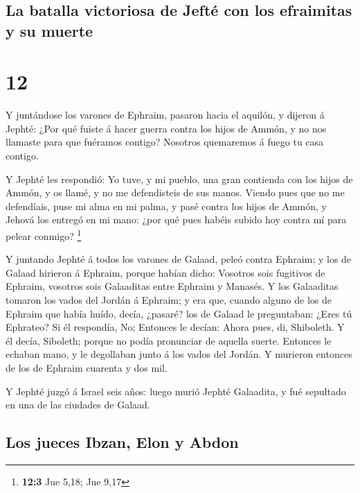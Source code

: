 \hypertarget{la-batalla-victoriosa-de-jeftuxe9-con-los-efraimitas-y-su-muerte}{%
\subsection{La batalla victoriosa de Jefté con los efraimitas y su
muerte}\label{la-batalla-victoriosa-de-jeftuxe9-con-los-efraimitas-y-su-muerte}}

\hypertarget{section-11}{%
\section{12}\label{section-11}}

 Y juntándose los varones de Ephraim, pasaron hacia el
aquilón, y dijeron á Jephté: ¿Por qué fuiste á hacer guerra contra los
hijos de Ammón, y no nos llamaste para que fuéramos contigo? Nosotros
quemaremos á fuego tu casa contigo.

 Y Jephté les respondió: Yo tuve, y mi pueblo, una gran
contienda con los hijos de Ammón, y os llamé, y no me defendisteis de
sus manos.  Viendo pues que no me defendíais, puse mi alma
en mi palma, y pasé contra los hijos de Ammón, y Jehová los entregó en
mi mano: ¿por qué pues habéis subido hoy contra mí para pelear conmigo?
\footnote{\textbf{12:3} Jue 5,18; Jue 9,17}

 Y juntando Jephté á todos los varones de Galaad, peleó
contra Ephraim; y los de Galaad hirieron á Ephraim, porque habían dicho:
Vosotros sois fugitivos de Ephraim, vosotros sois Galaaditas entre
Ephraim y Manasés.  Y los Galaaditas tomaron los vados del
Jordán á Ephraim; y era que, cuando alguno de los de Ephraim que había
huído, decía, ¿pasaré? los de Galaad le preguntaban: ¿Eres tú Ephrateo?
Si él respondía, No;  Entonces le decían: Ahora pues, di,
Shiboleth. Y él decía, Siboleth; porque no podía pronunciar de aquella
suerte. Entonces le echaban mano, y le degollaban junto á los vados del
Jordán. Y murieron entonces de los de Ephraim cuarenta y dos mil.

 Y Jephté juzgó á Israel seis años: luego murió Jephté
Galaadita, y fué sepultado en una de las ciudades de Galaad.

\hypertarget{los-jueces-ibzan-elon-y-abdon}{%
\subsection{Los jueces Ibzan, Elon y
Abdon}\label{los-jueces-ibzan-elon-y-abdon}}

